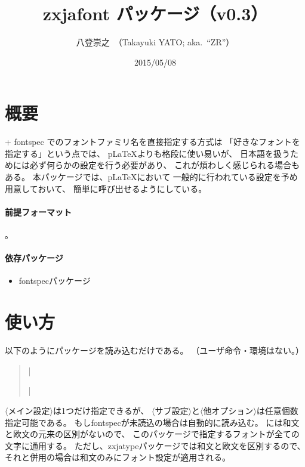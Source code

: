 \documentclass[a4paper]{bxjsarticle}
\newcommand{\PkgVersion}{0.3}
\newcommand{\Pkg}[1]{\textsf{#1}}
\newcommand{\Meta}[1]{$\langle$\mbox{}#1\mbox{}$\rangle$}
\providecommand{\pLaTeX}{p\LaTeX}
\begin{document}
\title{\Pkg{zxjafont} パッケージ（v\PkgVersion）}
\author{八登崇之\ （Takayuki YATO; aka.~``ZR''）}
\date{2015/05/08}
\maketitle

\section{概要}

{\XeLaTeX} + fontspec でのフォントファミリ名を直接指定する方式は
「好きなフォントを指定する」という点では、
{\pLaTeX}\>よりも格段に使い易いが、
日本語を扱うためには必ず何らかの設定を行う必要があり、
これが煩わしく感じられる場合もある。
本パッケージでは、{\pLaTeX}\>において
一般的に行われている設定を予め用意しておいて、
簡単に呼び出せるようにしている。

\paragraph{前提フォーマット}
{\XeLaTeX}。

\paragraph{依存パッケージ}
\begin{itemize}
\item \Pkg{fontspec}パッケージ
\end{itemize}

\section{使い方}

以下のようにパッケージを読み込むだけである。
（ユーザ命令・環境はない。）
\begin{quote}\small
|\usepackage[|\Meta{メイン設定}|,|\Meta{サブ設定}|,|%
\Meta{他オプション}|]{zxjafont}|
\end{quote}

\Meta{メイン設定}は1つだけ指定できるが、
\Meta{サブ設定}と\Meta{他オプション}は任意個数指定可能である。
もし\Pkg{fontspec}が未読込の場合は自動的に読み込む。
{\XeLaTeX}\>には和文と欧文の元来の区別がないので、
このパッケージで指定するフォントが全ての文字に通用する。
ただし、\Pkg{zxjatype}パッケージでは和文と欧文を区別するので、
それと併用の場合は和文のみにフォント設定が適用される。
\end{document}
